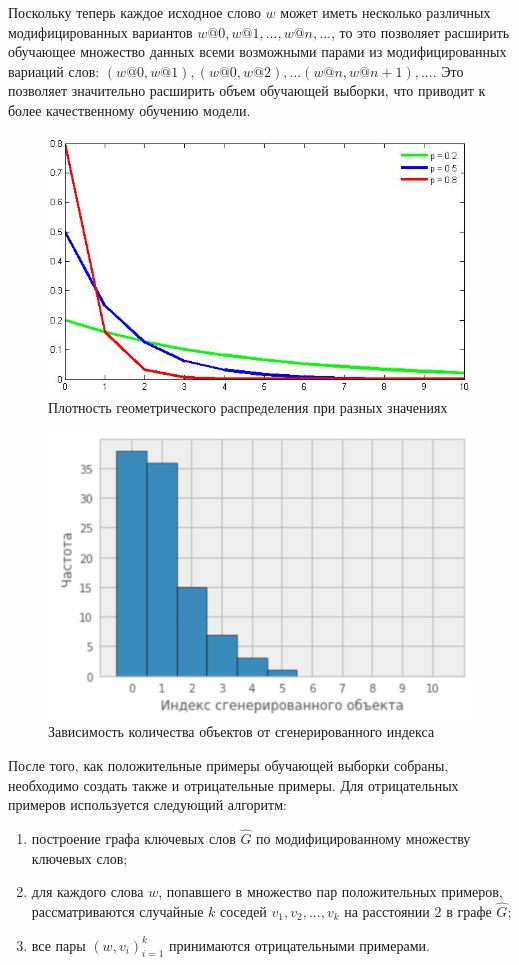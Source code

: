 Поскольку теперь каждое исходное слово $w$ может иметь несколько различных модифицированных вариантов $w@0, w@1, ..., w@n, ...$, то это позволяет расширить обучающее множество данных всеми возможными парами из модифицированных вариаций слов: $(w@0, w@1), (w@0, w@2), ... (w@n, w@n+1), ...$. Это позволяет значительно расширить объем обучающей выборки, что приводит к более качественному обучению модели.


\begin{figure}[ht]
  \begin{minipage}[ht]{1.0\linewidth}\centering
    \includegraphics[width=0.7\linewidth]{Dissertation/pics/geom_distr}
    \caption{Плотность геометрического распределения при разных значениях}
  \end{minipage}
  \label{img:geom_distr}
\end{figure}

\begin{figure}[ht]
  \begin{minipage}[ht]{1.0\linewidth}\centering
    \includegraphics[width=0.7\linewidth]{Dissertation/pics/geom_distr_2}
    \caption{Зависимость количества объектов от сгенерированного индекса}
  \end{minipage}
  \label{img:geom_distr_2}
\end{figure}
После того, как положительные примеры обучающей выборки собраны, необходимо создать также и отрицательные примеры. Для отрицательных примеров используется следующий алгоритм:
\begin{enumerate}
    \item построение графа ключевых слов $\hat{G}$ по модифицированному множеству ключевых слов;
    \item для каждого слова $w$, попавшего в множество пар положительных примеров, рассматриваются случайные $k$ соседей $v_1, v_2, ..., v_k$ на расстоянии $2$ в графе $\hat{G}$;
    \item все пары $(w, v_i)_{i=1}^k$ принимаются отрицательными примерами.
\end{enumerate}

